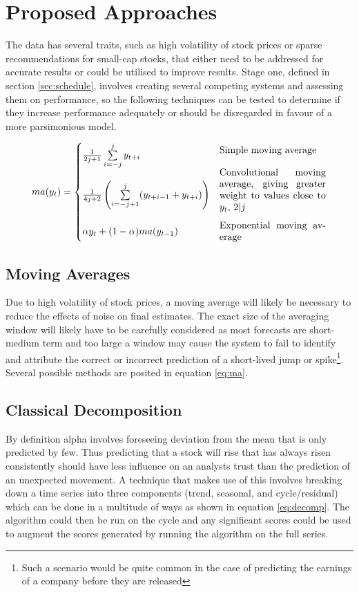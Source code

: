 \section{Proposed Approaches}\label{sec:plan}
The data has several traits, such as high volatility of stock prices or sparse recommendations for small-cap stocks, that either need to be addressed for accurate results or could be utilised to improve results. Stage one, defined in section \ref{sec:schedule}, involves creating several competing systems and assessing them on performance, so the following techniques can be tested to determine if they increase performance adequately or should be disregarded in favour of a more parsimonious model.

\begin{equation}
    ma(y_t) = \begin{cases}
    \frac{1}{2j+1} \sum\limits_{i=-j}^j y_{t+i} & \parbox{11em}{Simple moving average\\}\\
    \frac{1}{4j+2}\left(\sum\limits_{i=-j+1}^j (y_{t+i-1} + y_{t+i})\right) & \parbox{11em}{Convolutional moving average, giving greater weight to values close to $y_t$, $2|j$\\}\\
    \alpha y_t + (1-\alpha)ma(y_{t-1}) & \parbox{11em}{Exponential moving average}
    \end{cases}\label{eq:ma}
\end{equation}

\subsection{Moving Averages}
Due to high volatility of stock prices, a moving average will likely be necessary to reduce the effects of noise on final estimates. The exact size of the averaging window will likely have to be carefully considered as most forecasts are short-medium term and too large a window may cause the system to fail to identify and attribute the correct or incorrect prediction of a short-lived jump or spike\footnote{Such a scenario would be quite common in the case of predicting the earnings of a company before they are released}. Several possible methods are posited in equation \ref{eq:ma}.



\subsection{Classical Decomposition}
By definition alpha involves foreseeing deviation from the mean that is only predicted by few. Thus predicting that a stock will rise that has always risen consistently should have less influence on an analysts trust than the prediction of an unexpected movement. A technique that makes use of this involves breaking down a time series into three components (trend, seasonal, and cycle/residual) which can be done in a multitude of ways as shown in equation \ref{eq:decomp}. The algorithm could then be run on the cycle and any significant scores could be used to augment the scores generated by running the algorithm on the full series.



